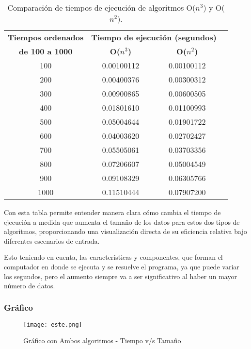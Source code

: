 \documentclass{report}
\begin{document}
\begin{table}[h]
    \centering
    \begin{tabular}{cccc}
        \toprule
        \textbf{Tiempos ordenados} & \multicolumn{2}{c}{\textbf{Tiempo de ejecución (segundos)}} \\
        \cmidrule(r){2-3}
        \textbf{de 100 a 1000} & \textbf{O($n^3$)} & \textbf{O($n^2$)} \\
        \midrule
        100  & 0.00100112 & 0.00100112 \\
        200  & 0.00400376 & 0.00300312 \\
        300  & 0.00900865 & 0.00600505 \\
        400  & 0.01801610 & 0.01100993 \\
        500  & 0.05004644 & 0.01901722 \\
        600  & 0.04003620 & 0.02702427 \\
        700  & 0.05505061 & 0.03703356 \\
        800  & 0.07206607 & 0.05004549 \\
        900  & 0.09108329 & 0.06305766 \\
        1000 & 0.11510444 & 0.07907200 \\
        \bottomrule
    \end{tabular}
    \caption{Comparación de tiempos de ejecución de algoritmos O($n^3$) y O($n^2$).}
    \label{tab:ejecucion_algoritmos}
\end{table}

Con esta tabla permite entender manera clara cómo cambia el tiempo de ejecución a medida que aumenta el tamaño de los datos para estos dos tipos de algoritmos, proporcionando una visualización directa de su eficiencia relativa bajo diferentes escenarios de entrada.

Esto teniendo en cuenta, las características y componentes, que forman el computador en donde se ejecuta y se resuelve el programa, ya que puede variar los segundos, pero el aumento siempre va a ser significativo al haber un mayor número de datos.

\subsubsection{Gráfico}

\begin{figure}[htb]
\centering
\texttt{[image: este.png]}
\caption{Gráfico con Ambos algoritmos - Tiempo v/s Tamaño}
\label{fig:tigre}
\end{figure}
\end{document}
